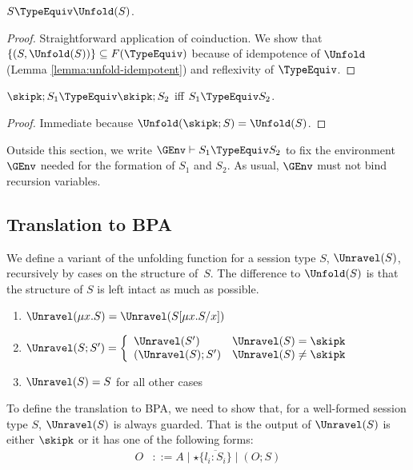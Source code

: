 \begin{lemma}
  \label{lem:app:unfold-type-sim}
  $S \TypeEquiv \Unfold(S)$.
\end{lemma}
\begin{proof}
  Straightforward application of coinduction. We show that $\{ (S, \Unfold (S)) \} \subseteq
  F (\TypeEquiv)$ because 
  of idempotence of $\Unfold$ (Lemma \ref{lemma:unfold-idempotent}) and reflexivity of $\TypeEquiv$.
\end{proof}

\begin{lemma}
  \label{lem:app:skip-elim}
  $\skipk;S_1 \TypeEquiv \skipk;S_2$ iff $S_1 \TypeEquiv S_2$.
\end{lemma}
\begin{proof}
  Immediate because $\Unfold (\skipk; S) = \Unfold (S)$.
\end{proof}

Outside this section, we write $\GEnv \vdash S_1 \TypeEquiv S_2$ to fix the environment $\GEnv$
needed for the formation of $S_1$ and $S_2$. As usual, $\GEnv$ must
not bind recursion variables.


\subsection{Translation to BPA}
\label{sec:translation-bpa}

We define a variant of the unfolding
function for a session type $S$,  $\Unravel(S)$, recursively by cases on the
structure of~$S$. The difference to $\Unfold (S)$ is that the
structure of $S$ is left intact as much as possible.
\begin{enumerate}
\item $\Unravel(\mu x.S) = \Unravel(S[\mu x.S/x])$
\item $\Unravel (S;S') = \left\{%
  \begin{array}{ll}
    \Unravel(S') & \Unravel(S) = \skipk
    \\
    (\Unravel(S); S') & \Unravel(S) \ne \skipk
  \end{array}
  \right.
$
\item $\Unravel (S) = S$ for all other cases
\end{enumerate}


To define the translation to BPA,
we need to show that, for a well-formed session type $S$, $\Unravel
(S)$ is always guarded. That is the output of $\Unravel (S)$ is either
$\skipk$ or it has one
of the following forms:
\begin{align*}
  O &::= A \mid \star\{\overline{l_i:S_i}\} \mid (O; S)
\end{align*}

